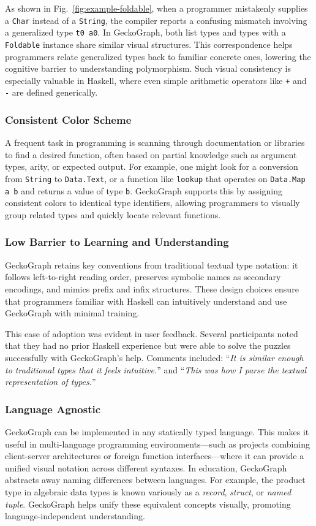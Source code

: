 \documentclass[preprint,12pt]{elsarticle}
\begin{document}
As shown in Fig.~\ref{fig:example-foldable}, when a programmer mistakenly supplies a \texttt{Char} instead of a \texttt{String}, the compiler reports a confusing mismatch involving a generalized type \texttt{t0 a0}. 
In GeckoGraph, both list types and types with a \texttt{Foldable} instance share similar visual structures. 
This correspondence helps programmers relate generalized types back to familiar concrete ones, lowering the cognitive barrier to understanding polymorphism. 
Such visual consistency is especially valuable in Haskell, where even simple arithmetic operators like {\tt +} and {\tt -} are defined generically.

\subsubsection{Consistent Color Scheme}\label{par:color-scheme}
A frequent task in programming is scanning through documentation or libraries to find a desired function, often based on partial knowledge such as argument types, arity, or expected output. 
For example, one might look for a conversion from \texttt{String} to \texttt{Data.Text}, or a function like \texttt{lookup} that operates on \texttt{Data.Map a b} and returns a value of type \texttt{b}. 
GeckoGraph supports this by assigning consistent colors to identical type identifiers, allowing programmers to visually group related types and quickly locate relevant functions.

\subsubsection{Low Barrier to Learning and Understanding}
GeckoGraph retains key conventions from traditional textual type notation: it follows left-to-right reading order, preserves symbolic names as secondary encodings, and mimics prefix and infix structures. 
These design choices ensure that programmers familiar with Haskell can intuitively understand and use GeckoGraph with minimal training.

This ease of adoption was evident in user feedback. Several participants noted that they had no prior Haskell experience but were able to solve the puzzles successfully with GeckoGraph’s help. 
Comments included: 
``{\it It is similar enough to traditional types that it feels intuitive.}'' and 
``{\it This was how I parse the textual representation of types.}''

\subsubsection{Language Agnostic}
GeckoGraph can be implemented in any statically typed language. 
This makes it useful in multi-language programming environments—such as projects combining client-server architectures or foreign function interfaces—where it can provide a unified visual notation across different syntaxes. 
In education, GeckoGraph abstracts away naming differences between languages. 
For example, the product type in algebraic data types is known variously as a \textit{record}, \textit{struct}, or \textit{named tuple}. 
GeckoGraph helps unify these equivalent concepts visually, promoting language-independent understanding.
\end{document}
